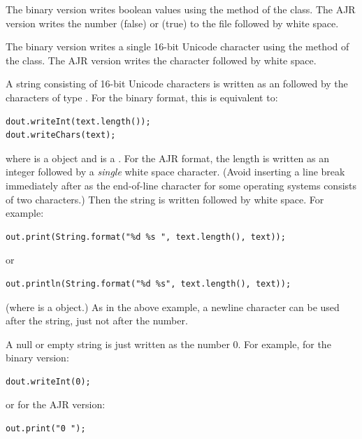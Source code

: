 \begin{deflist}
\begin{itemdesc}
The binary version writes boolean values using the
 method of the
 class. The \gls{AJR} version writes
the number  (false) or  (true) to the file
followed by white space.
\end{itemdesc}

\begin{itemdesc}
The binary version writes a single 16-bit Unicode character using
the  method of the
 class. The \gls{AJR} version writes
the character followed by white space.
\end{itemdesc}

\begin{itemdesc}
A string consisting of  16-bit Unicode characters is written
as an  followed by the  characters of type
. For the binary format, this is equivalent to:
\begin{verbatim}
dout.writeInt(text.length());
dout.writeChars(text);
\end{verbatim}
where  is a  object
and  is a . For the \gls{AJR} format,
the length is written as an integer followed by a \emph{single}
white space character. (Avoid inserting a line break immediately
after  as the end-of-line character for some operating systems consists of two
characters.) Then the string is written followed by white space.
For example:
\begin{verbatim}
out.print(String.format("%d %s ", text.length(), text));
\end{verbatim}
or
\begin{verbatim}
out.println(String.format("%d %s", text.length(), text));
\end{verbatim}
(where  is a  object.)
As in the above example, a newline character can be used after the
string, just not after the number.

A null or empty string is just written as the number 0. For example,
for the binary version:
\begin{verbatim}
dout.writeInt(0);
\end{verbatim}
or for the \gls{AJR} version:
\begin{verbatim}
out.print("0 ");
\end{verbatim}
\end{itemdesc}


\end{deflist}
